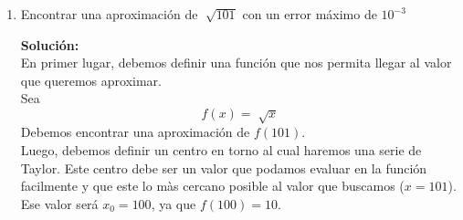 \documentclass[12pt]{article}
\newenvironment{solucion}
{\begin{mdframed}[backgroundcolor=black!10]
		{\bf Solución:}\\
	}
	{
	\end{mdframed}
}
\newenvironment{preguntas}
{\begin{enumerate}\itemsep12pt
	}
	{
	\end{enumerate}
}
\begin{document}
\begin{preguntas}
\begin{solucion}
\begin{enumerate}[a)]
Eliminando los términos nulos, podemos ver que
$$f(x) = 1 + - \dfrac{x^2}{2!} + \dfrac{x^4}{4!} - \dfrac{x^6}{6!} + \dots$$
Luego,
$$cos(x) = \sum_0^{\infty} (-1)^n\dfrac{x^{2n}}{(2n)!}$$
\item $f(x) = \dfrac{1}{1-x}$\\
\\
$$
\begin{array}{rcrcrcrcr}
f(x) & = &\dfrac{1}{1-x}&\qquad & f(0) & = &1& = &0!\\
f'(x) & =& \dfrac{1}{(1-x)^2} &\qquad & f'(0) & = &1& =& 1!\\
f''(x) & =& \dfrac{2}{(1-x)^3} &\qquad & f''(0) & = &2&=&2!\\
f'''(x) & =& \dfrac{6}{(1-x)^4} &\qquad & f'''(0) & = &6&=&3!\\
&\vdots&&&&\vdots\\
f^{(n)}(x) & =& \dfrac{n!}{(1-x)^n} &\qquad & f^{(n)}(0) & = &n!
\end{array}
$$
De esta forma, podemos ver que la serie de Taylor será
$$f(x) = f(0) + \dfrac{f'(0)}{1!}(x-0) + \dfrac{f''(0)}{2!}(x-0)^2 + \dfrac{f'''(0)}{3!}(x-0)^3 + \dots$$
Reemplazando
$$f(x) = 1 + \dfrac{1!}{1!}x - \dfrac{2!}{2!}x^2 + \dfrac{3!}{3!}x^3 +\dots$$
Simplificando
$$f(x) = 1 + x + x^2 + x^3 + \dots$$
Luego,
$$\dfrac{1}{1-x} = \sum_0^{\infty} x^n$$
\end{enumerate}
\end{solucion}
\item Encontrar una aproximación de $\sqrt[]{101}$ con un error máximo de $10^{-3}$
\begin{solucion}
En primer lugar, debemos definir una función que nos permita llegar al valor que queremos aproximar.\\

Sea
$$f(x) = \sqrt[]{x}$$
Debemos encontrar una aproximación de $f(101)$.\\

Luego, debemos definir un centro en torno al cual haremos una serie de Taylor. Este centro debe ser un valor que podamos evaluar en la función facilmente y que este lo màs cercano posible al valor que buscamos ($x = 101$). \\

Ese valor será $x_0=100$, ya que $f(100) = 10$.\\


\end{solucion}
\end{preguntas}
\end{document}
